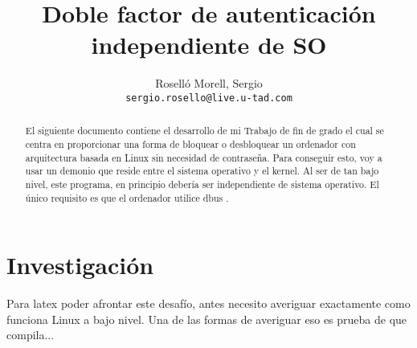 \documentclass[titlepage]{article}
\title{Doble factor de autenticación independiente de SO}
\author{Roselló Morell, Sergio\\
\texttt{sergio.rosello@live.u-tad.com}}
\begin{document}
\maketitle
\tableofcontents

\begin{abstract}
El siguiente documento contiene el desarrollo de mi Trabajo de fin de grado el cual se centra en proporcionar una forma de bloquear o desbloquear un ordenador con arquitectura basada en Linux sin necesidad de contraseña. Para conseguir esto, voy a usar un demonio que reside entre el sistema operativo y el kernel. Al ser de tan bajo nivel, este programa, en principio debería ser independiente de sistema operativo. El único requisito es que el ordenador utilice dbus \cite{dbus}.
\end{abstract}
\section{Investigación}
Para \Gls{latex} poder afrontar este desafío, antes necesito averiguar exactamente como funciona Linux a bajo nivel. Una de las formas de averiguar eso es prueba de que compila...
\clearpage
\printglossaries
\clearpage
\printbibliography[heading=bibintoc,title={Bibliografía}]
\end{document}
